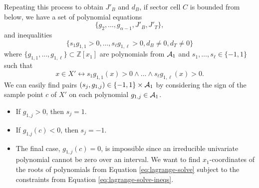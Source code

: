 \documentclass[
]{book}
\providecommand{\tightlist}{%
  \setlength{\itemsep}{0pt}\setlength{\parskip}{0pt}}
\theoremstyle{definition}
\theoremstyle{definition}
\theoremstyle{definition}
\theoremstyle{definition}
\theoremstyle{remark}
\begin{document}
Repeating this process to obtain \(J'_B\) and \(d_B\), if sector cell \(C\) is bounded from below, we have a set of polynomial equations
\begin{equation}
\{ g_2,\ldots,g_{\alpha-1}, J'_B, J'_T \},
\label{eq:lagrange-solve}
\end{equation}
and inequalities
\begin{equation}
\{ s_1 g_{1,1} > 0, \ldots, s_\ell g_{1,\ell} > 0, d_B \ne 0, d_T \ne 0 \}
\label{eq:lagrange-solve-ineqs}
\end{equation}
where \(\{ g_{1,1},\ldots,g_{1,\ell} \} \subset \mathbb{Z}[x_1]\) are polynomials from \({\cal A}_1\) and \(s_1,\ldots,s_\ell \in \{-1,1\}\) such that \[
x \in X' \leftrightarrow s_1 g_{1,1}(x) > 0 \land \ldots \land s_\ell g_{1,\ell}(x) > 0.
\]
We can easily find pairs \((s_j, g_{1,j}) \in \{-1,1\} \times {\cal A}_1\) by considering the sign of the sample point \(c\) of \(X'\) on each polynomial \(g_{1,j} \in {\cal A}_1\).

\begin{itemize}
\tightlist
\item
  If \(g_{1,j} > 0\), then \(s_j = 1\).
\item
  If \(g_{1.j}(c) < 0\), then \(s_j = -1\).
\item
  The final case, \(g_{1,j}(c) = 0\), is impossible since an irreducible univariate polynomial cannot be zero over an interval.
  We want to find \(x_1\)-coordinates of the roots of polynomials from Equation \eqref{eq:lagrange-solve} subject to the constraints from Equation \eqref{eq:lagrange-solve-ineqs}.
\end{itemize}
\end{document}
